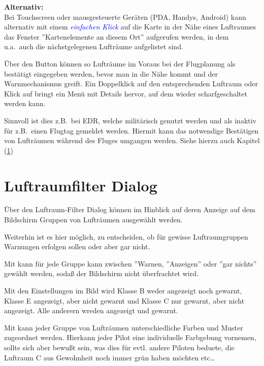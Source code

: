 \textbf{Alternativ:}\\
Bei Touchscreen oder mausgesteuerte Geräten (PDA, Handys, Android)
kann alternativ mit einem \textsl{\textcolor{blue}{einfachen Klick}} auf die Karte in der Nähe eines
 Luftraumes das Fenster \textsf{''Kartenelemente an diesem Ort}'' aufgerufen werden, in dem u.a.\ auch die nächstgelegenen Lufträume aufgelistet sind. 

Über den Button  können so Lufträume im Voraus bei der Flugplanung als bestätigt eingegeben werden, bevor man in die Nähe kommt und der Warnmechanismus greift.
Ein Doppelklick auf den entsprechenden Luftraum oder Klick auf  bringt ein Menü mit Details hervor, auf dem wieder scharfgeschaltet werden kann.

Sinnvoll ist dies z.B.\ bei EDR, welche militärisch genutzt werden und als inaktiv für z.B.\
einen Flugtag gemeldet werden. Hiermit kann das notwendige Bestätigen von
Lufträumen während des Fluges umgangen werden.  Siehe hierzu auch Kapitel (\ref{sec:airsp-filt-dial})

\section{Luftraumfilter Dialog}\label{sec:airsp-filt-dial} 

Über den Luftraum-Filter Dialog können im Hinblick auf deren Anzeige auf dem Bildschirm Gruppen von Lufträumen  ausgewählt werden. 

Weiterhin ist es hier möglich, zu entscheiden, ob für gewisse Luftraumgruppen Warnungen erfolgen sollen oder aber gar nicht. 
\menulabel{\button{Kartenanzeige}\blink\button{Luftraum}}

Mit kann für jede Gruppe kann zwischen ''Warnen, ''Anzeigen'' oder ''gar nichts'' gewählt werden, sodaß der Bildschirm nicht überfrachtet wird. 

Mit den Einstellungen im Bild wird Klasse B weder angezeigt noch gewarnt, Klasse E angezeigt, aber nicht gewarnt und Klasse C nur gewarnt, aber nicht angezeigt. Alle anderern wreden angezeigt und gewarnt.  

  Mit  kann jeder Gruppe von Lufträumen unterschiedliche Farben und Muster zugeordnet werden. Hierkann jeder Pilot eine individuelle Farbgebung vornemen, sollte sich aber bewußt sein, was dies für evtl. andere Piloten beduete, die Luftraum C aus Gewohnheit noch immer grün haben möchten etc\dots  
 
